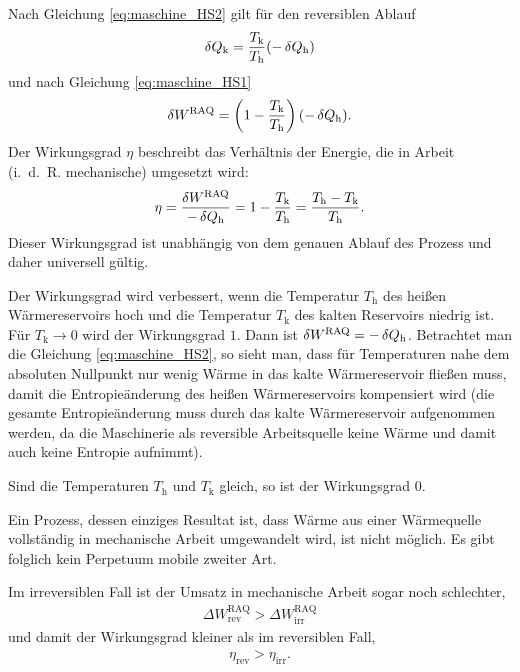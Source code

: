 Nach Gleichung \eqref{eq:maschine_HS2} gilt für den reversiblen Ablauf
\begin{align*}
    \mathop{}\!\delta Q_\mathrm{k} = \frac{T_\mathrm{k}}{T_\mathrm{h}} (-\mathop{}\!\delta Q_\mathrm{h})
\end{align*}
und nach Gleichung \eqref{eq:maschine_HS1}
\begin{align*}
    \mathop{}\!\delta W^\mathrm{RAQ} = \left( 1-\frac{T_\mathrm{k}}{T_\mathrm{h}} \right) (-\mathop{}\!\delta Q_\mathrm{h}).
\end{align*}
Der Wirkungsgrad $\eta$ beschreibt das Verhältnis der Energie, die in Arbeit (i.~d.~R. mechanische) umgesetzt wird:
\begin{align*}
    \eta = \frac{\mathop{}\!\delta W^\mathrm{RAQ}}{-\mathop{}\!\delta Q_\mathrm{h}} = 1-\frac{T_\mathrm{k}}{T_\mathrm{h}}=\frac{T_\mathrm{h}-T_\mathrm{k}}{T_\mathrm{h}}. 
\end{align*}
Dieser Wirkungsgrad ist unabhängig von dem genauen Ablauf des Prozess und daher universell gültig. 

Der Wirkungsgrad wird verbessert, wenn die Temperatur $T_\mathrm{h}$ des heißen Wärmereservoirs hoch und die Temperatur $T_\mathrm{k}$ des kalten Reservoirs niedrig ist. Für $T_\mathrm{k}\rightarrow 0$ wird der Wirkungsgrad $1$. 
Dann ist $\mathop{}\!\delta W^\mathrm{RAQ}=-\mathop{}\!\delta Q_\mathrm{h}$. 
Betrachtet man die Gleichung \eqref{eq:maschine_HS2}, so sieht man, dass für Temperaturen nahe dem absoluten Nullpunkt nur wenig Wärme in das kalte Wärmereservoir fließen muss, damit die Entropieänderung des heißen Wärmereservoirs kompensiert wird (die gesamte Entropieänderung muss durch das kalte Wärmereservoir aufgenommen werden, da die Maschinerie als reversible Arbeitsquelle keine Wärme und damit auch keine Entropie aufnimmt). 

Sind die Temperaturen $T_\mathrm{h}$ und $T_\mathrm{k}$ gleich, so ist der Wirkungsgrad $0$. 
\begin{formal}
    Ein Prozess, dessen einziges Resultat ist, dass Wärme aus einer Wärmequelle vollständig in mechanische Arbeit umgewandelt wird, ist nicht möglich. Es gibt folglich kein Perpetuum mobile zweiter Art. 
\end{formal}


Im irreversiblen Fall ist der Umsatz in mechanische Arbeit sogar noch schlechter, 
\begin{align*}
    \Delta W_\mathrm{rev}^\mathrm{RAQ} > \Delta W_\mathrm{irr}^\mathrm{RAQ}
\end{align*}
und damit der Wirkungsgrad kleiner als im reversiblen Fall,
\begin{align*}
    \eta_\mathrm{rev}>\eta_\mathrm{irr}. 
\end{align*}



